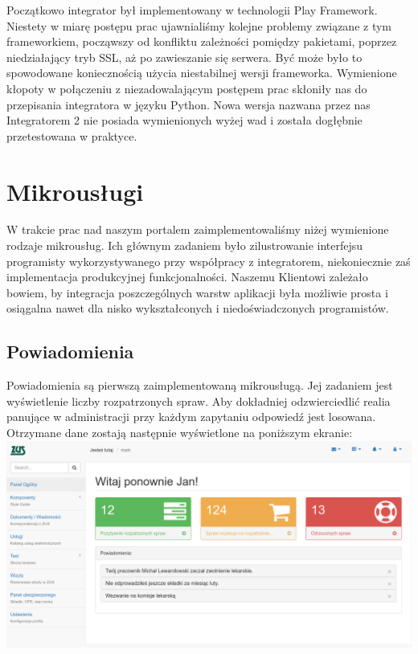 \documentclass[licencjacka]{pracamgr}
\begin{document}
Początkowo integrator był implementowany w technologii Play Framework. Niestety
w miarę postępu prac ujawnialiśmy kolejne problemy związane z tym frameworkiem,
począwszy od konfliktu zależności pomiędzy pakietami, poprzez niedziałający tryb
SSL, aż po zawieszanie się serwera. Być może było to spowodowane koniecznością
użycia niestabilnej wersji frameworka. Wymienione kłopoty w połączeniu z niezadowalającym
postępem prac skłoniły nas do przepisania integratora w języku Python. Nowa wersja
nazwana przez nas Integratorem 2 nie posiada wymienionych wyżej wad i została
dogłębnie przetestowana w praktyce.

\section{Mikrousługi}

W trakcie prac nad naszym portalem zaimplementowaliśmy niżej wymienione rodzaje
mikrousług. Ich głównym zadaniem było zilustrowanie interfejsu programisty
wykorzystywanego przy współpracy z integratorem, niekoniecznie zaś implementacja
produkcyjnej funkcjonalności. Naszemu Klientowi zależało bowiem, by integracja
poszczególnych warstw aplikacji była możliwie prosta i osiągalna nawet dla nisko
wykształconych i niedoświadczonych programistów.

\subsection{Powiadomienia}

Powiadomienia są pierwszą zaimplementowaną mikrousługą. Jej zadaniem jest wyświetlenie
liczby rozpatrzonych spraw. Aby dokładniej odzwierciedlić realia panujące w
administracji przy każdym zapytaniu odpowiedź jest losowana. Otrzymane dane
zostają następnie wyświetlone na poniższym ekranie:\\
\includegraphics[width=\textwidth]{obrazki/powiadomienia2.png}
\end{document}
